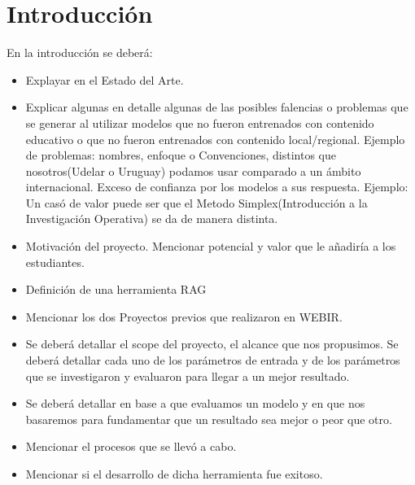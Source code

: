 \documentclass{../../prgrado}
\begin{document}
\tableofcontents
\newpage



\mainmatter %

\chapter{Introducción}

En la introducción se deberá:
\begin{itemize}
    \item  Explayar en el Estado del Arte.
    \item Explicar algunas en detalle algunas de las posibles falencias o problemas que se generar al utilizar modelos que no fueron entrenados con contenido educativo o que no fueron entrenados con contenido local/regional. 
    Ejemplo de problemas: nombres, enfoque o Convenciones, distintos que nosotros(Udelar o Uruguay) podamos usar comparado a un ámbito internacional. 
    Exceso de confianza por los modelos a sus respuesta. 
    Ejemplo: Un casó de valor puede ser que el Metodo Simplex(Introducción a la Investigación Operativa) se da de manera distinta.
    \item Motivación del proyecto. Mencionar potencial y valor que le añadiría a los estudiantes. 
    \item Definición de una herramienta RAG
    \item Mencionar los dos Proyectos previos que realizaron en WEBIR.
    \item Se deberá detallar el scope del proyecto, el alcance que nos propusimos. Se deberá detallar cada uno de los parámetros de entrada y de los parámetros que se investigaron y evaluaron para llegar a un mejor resultado.
    \item Se deberá detallar en base a que evaluamos un modelo y en que nos basaremos para fundamentar que un resultado sea mejor o peor que otro.
    \item  Mencionar el procesos que se llevó a cabo.
    \item Mencionar si el desarrollo de dicha herramienta fue exitoso.
\end{itemize}
\end{document}
